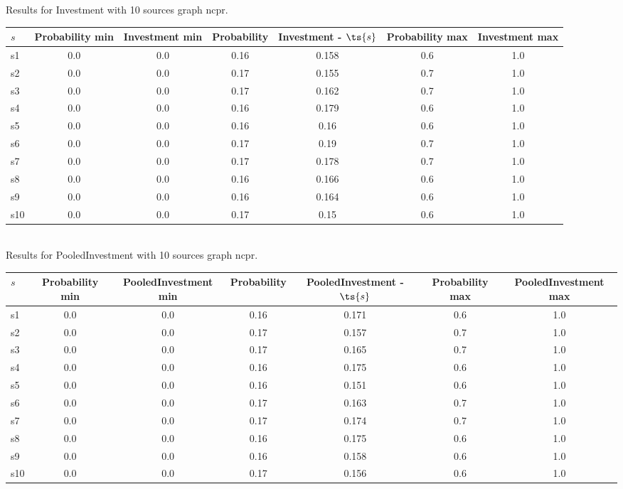 \documentclass{article}
\begin{document}
\noindent Results for Investment with 10 sources graph ncpr.

\noindent\begin{tabular}{|l|c|c|c|c|c|c|}
\hline
$s$& Probability min & Investment min & Probability & Investment - $\ts{s}$ & Probability max & Investment max\\
\hline
s1 &0.0 & 0.0 & 0.16 & 0.158 & 0.6 & 1.0\\
\hline
s2 &0.0 & 0.0 & 0.17 & 0.155 & 0.7 & 1.0\\
\hline
s3 &0.0 & 0.0 & 0.17 & 0.162 & 0.7 & 1.0\\
\hline
s4 &0.0 & 0.0 & 0.16 & 0.179 & 0.6 & 1.0\\
\hline
s5 &0.0 & 0.0 & 0.16 & 0.16 & 0.6 & 1.0\\
\hline
s6 &0.0 & 0.0 & 0.17 & 0.19 & 0.7 & 1.0\\
\hline
s7 &0.0 & 0.0 & 0.17 & 0.178 & 0.7 & 1.0\\
\hline
s8 &0.0 & 0.0 & 0.16 & 0.166 & 0.6 & 1.0\\
\hline
s9 &0.0 & 0.0 & 0.16 & 0.164 & 0.6 & 1.0\\
\hline
s10 &0.0 & 0.0 & 0.17 & 0.15 & 0.6 & 1.0\\
\hline
\end{tabular}\\

\noindent Results for PooledInvestment with 10 sources graph ncpr.

\noindent\begin{tabular}{|l|c|c|c|c|c|c|}
\hline
$s$& Probability min & PooledInvestment min & Probability & PooledInvestment - $\ts{s}$ & Probability max & PooledInvestment max\\
\hline
s1 &0.0 & 0.0 & 0.16 & 0.171 & 0.6 & 1.0\\
\hline
s2 &0.0 & 0.0 & 0.17 & 0.157 & 0.7 & 1.0\\
\hline
s3 &0.0 & 0.0 & 0.17 & 0.165 & 0.7 & 1.0\\
\hline
s4 &0.0 & 0.0 & 0.16 & 0.175 & 0.6 & 1.0\\
\hline
s5 &0.0 & 0.0 & 0.16 & 0.151 & 0.6 & 1.0\\
\hline
s6 &0.0 & 0.0 & 0.17 & 0.163 & 0.7 & 1.0\\
\hline
s7 &0.0 & 0.0 & 0.17 & 0.174 & 0.7 & 1.0\\
\hline
s8 &0.0 & 0.0 & 0.16 & 0.175 & 0.6 & 1.0\\
\hline
s9 &0.0 & 0.0 & 0.16 & 0.158 & 0.6 & 1.0\\
\hline
s10 &0.0 & 0.0 & 0.17 & 0.156 & 0.6 & 1.0\\
\hline
\end{tabular}\\
\end{document}
